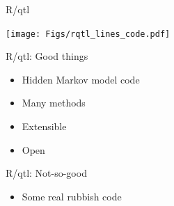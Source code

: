 \documentclass[12pt]{article}
\newcommand{\headsize}{\fontsize{35}{35} \selectfont}
\newcommand{\smallsize}{\fontsize{25}{30} \selectfont}
\begin{document}
{\begin{minipage}{10in}
\begin{itemize}
 \end{itemize}
 \end{minipage}



\newpage


\headsize \color{myyellow}
\hfill \begin{minipage}{5.75in}
\centering
R/qtl
\end{minipage}

\vfill

\centerline{\texttt{[image: Figs/rqtl\_lines\_code.pdf]}}

\vspace{15mm}


\newpage


\headsize \color{myyellow}
\hfill \begin{minipage}{5.75in}
\centering
R/qtl: Good things
\end{minipage}

\vspace{25mm}

\color{mywhite}
\smallsize

\hfill \begin{minipage}{10in}
\begin{itemize}
\itemsep24pt
\item Hidden Markov model code

\item Many methods

\item Extensible

\item Open

\end{itemize}
\end{minipage}


\newpage


\headsize \color{myyellow}
\hfill \begin{minipage}{5.75in}
\centering
R/qtl: Not-so-good
\end{minipage}

\vspace{10mm}

\color{mywhite}
\smallsize

\hfill \begin{minipage}{10in}
\begin{itemize}
\itemsep16pt
\item Some real rubbish code


\end{itemize}
\end{minipage}}
\end{document}
